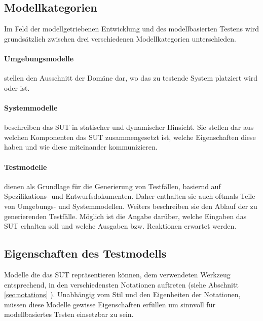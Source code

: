 \subsection{Modellkategorien} 
Im Feld der modellgetriebenen Entwicklung und des modellbasierten Testens wird grundsätzlich zwischen drei verschiedenen Modellkategorien unterschieden.

\paragraph{Umgebungsmodelle} stellen den Ausschnitt der Domäne dar, wo das zu testende System platziert wird oder ist.
\paragraph{Systemmodelle} beschreiben das SUT in statischer und dynamischer Hinsicht. Sie stellen dar aus welchen Komponenten das SUT zusammengesetzt ist, welche Eigenschaften diese haben und wie diese miteinander kommunizieren. 
\paragraph{Testmodelle} dienen als Grundlage für die Generierung von Testfällen, basiernd auf Spezifikations- und Entwurfsdokumenten. Daher enthalten sie auch oftmals Teile von Umgebungs- und Systemmodellen. Weiters beschreiben sie den Ablauf der zu generierenden Testfälle. Möglich ist die Angabe darüber, welche Eingaben das SUT erhalten soll und welche Ausgaben bzw. Reaktionen erwartet werden.

\subsection{Eigenschaften des Testmodells} \todo[]{}
\label{sec:eigenschaften_modell}
Modelle die das \ac{SUT} repräsentieren können, dem verwendeten Werkzeug entsprechend, in den verschiedensten Notationen auftreten (siehe Abschnitt \ref{sec:notations} ). Unabhängig vom Stil und den Eigenheiten der Notationen, müssen diese Modelle gewisse Eigenschaften erfüllen um sinnvoll für modellbasiertes Testen einsetzbar zu sein.\\

